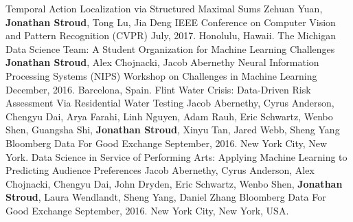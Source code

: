 \begin{cventries}
    \pubentry
        {Temporal Action Localization via Structured Maximal Sums}
        {Zehuan Yuan, \textbf{Jonathan Stroud}, Tong Lu, Jia Deng}
        {IEEE Conference on Computer Vision and Pattern Recognition (CVPR)}
        {July, 2017.}
        {Honolulu, Hawaii.}
        {}
    \pubentry
        {The Michigan Data Science Team: A Student Organization for Machine Learning Challenges}
        {\textbf{Jonathan Stroud}, Alex Chojnacki, Jacob Abernethy}
        {Neural Information Processing Systems (NIPS) Workshop on Challenges in Machine Learning}
        {December, 2016.}
        {Barcelona, Spain.}
        {}
    \pubentry
        {Flint Water Crisis: Data-Driven Risk Assessment Via Residential Water Testing}
        {Jacob Abernethy, Cyrus Anderson, Chengyu Dai, Arya Farahi, Linh Nguyen, Adam Rauh, Eric Schwartz, Wenbo Shen, Guangsha Shi, \textbf{Jonathan Stroud}, Xinyu Tan, Jared Webb, Sheng Yang}
        {Bloomberg Data For Good Exchange}
        {September, 2016.}
        {New York City, New York.}
        {}
    \pubentry
        {Data Science in Service of Performing Arts: Applying Machine Learning to Predicting Audience Preferences}
        {Jacob Abernethy, Cyrus Anderson, Alex Chojnacki, Chengyu Dai,
          John Dryden, Eric Schwartz, Wenbo Shen, \textbf{Jonathan
            Stroud}, Laura Wendlandt, Sheng Yang, Daniel Zhang}
        {Bloomberg Data For Good Exchange}
        {September, 2016.}
        {New York City, New York, USA.}
        {}
\end{cventries}
